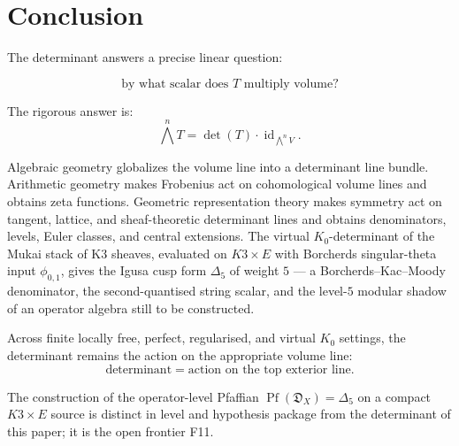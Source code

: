\documentclass[11pt]{memoir}
\providecommand{\id}{\operatorname{id}}
\providecommand{\Pf}{\operatorname{Pf}}
\begin{document}
\chapter*{Conclusion}

The determinant answers a precise linear question:

\[
  \text{by what scalar does }T\text{ multiply volume?}
\]

The rigorous answer is:
\[
  \bigwedge^nT=\det(T)\cdot\id_{\bigwedge^nV}.
\]

Algebraic geometry globalizes the volume line into a determinant line
bundle. Arithmetic geometry makes Frobenius act on cohomological
volume lines and obtains zeta functions. Geometric representation
theory makes symmetry act on tangent, lattice, and sheaf-theoretic
determinant lines and obtains denominators, levels, Euler classes, and
central extensions. The virtual $K_0$-determinant of the Mukai stack
of K3 sheaves, evaluated on $K3 \times E$ with Borcherds
singular-theta input $\phi_{0,1}$, gives the Igusa cusp form
$\Delta_5$ of weight $5$ — a Borcherds--Kac--Moody denominator, the
second-quantised string scalar, and the level-$5$ modular shadow of an
operator algebra still to be constructed.

Across finite locally free, perfect, regularised, and virtual
$K_0$ settings, the determinant remains the action on the appropriate
volume line:
\[
  \boxed{\text{determinant}=\text{action on the top exterior line}.}
\]

The construction of the operator-level Pfaffian
$\Pf(\mathfrak D_X) = \Delta_5$ on a compact $K3 \times E$ source is
distinct in level and hypothesis package from the determinant of this
paper; it is the open frontier F11.
\end{document}
